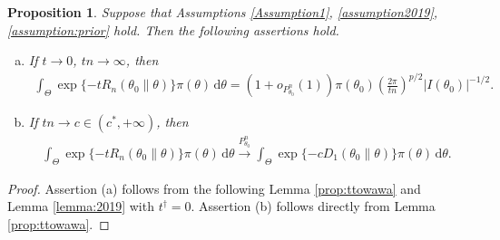 \documentclass[11pt]{article}
\theoremstyle{plain}
\newtheorem{proposition}{\quad\quad Proposition}
\theoremstyle{definition}
\theoremstyle{remark}
\begin{document}
\begin{appendices}
\begin{proposition}
    Suppose that Assumptions \ref{Assumption1}, \ref{assumption2019}, \ref{assumption:prior} hold.
Then the following assertions hold.
\begin{enumerate}[(a)]
        \item 
            If $t \to 0$, $tn \to \infty$, then
\begin{align*}
     \int_{\Theta} \exp \{-t R_n (\theta_0\| \theta)\} \pi (\theta) \, \mathrm d \theta  
     = (1+o_{P_{\theta_0}^n}(1))\pi(\theta_0) \left( \frac{2\pi}{tn} \right)^{p/2} |I(\theta_0)|^{-1/2}.
\end{align*}
        \item
            If $tn \to c \in (c^*,+\infty)$, then
\begin{align*}
     \int_{\Theta} \exp \{-t R_n (\theta_0\| \theta)\} \pi (\theta) \, \mathrm d \theta  
     \xrightarrow{P_{\theta_0}^n}
    \int_\Theta \exp \{-c D_1 \left( \theta_0 \| \theta \right)\} \pi(\theta) \, \mathrm d \theta.
\end{align*}
    \end{enumerate}
    \label{prop:tto0}
\end{proposition}
\begin{proof}
    Assertion (a) follows from the following Lemma \ref{prop:ttowawa} and Lemma \ref{lemma:2019} with $t^\dagger = 0$.
    Assertion (b) follows directly from Lemma \ref{prop:ttowawa}.
\end{proof}




\end{appendices}
\end{document}
